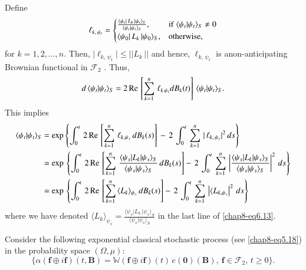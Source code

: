 Define 
\begin{eqnarray}
\ell_{k,\,\psi_t}=
		\begin{cases}
		\frac{\langle \psi_t\vert\, L_k\,\vert\psi_t\rangle_S}{\langle \psi_t\vert \psi_t\rangle_S}, &   {\rm if}\ \langle \psi_t\vert \psi_t\rangle_S\neq 0 \\
		\langle \psi_0\vert\, L_k\,\vert\psi_0\rangle_S, &  {\rm otherwise,}
		\end{cases}\label{chap8-eq6.11}
\end{eqnarray}
for $k=1,2,\ldots , n$.  Then, $\vert  \ell_{k,\,\psi_t} \vert \leq \vert\vert L_k\,\vert\vert$ and hence, $\ell_{k,\, \psi_t}$ is a\break non-anticipating Brownian functional in  $\mathcal{F}_2$ . Thus,    
\begin{eqnarray} 
d\, \langle \psi_t\vert \psi_t\rangle_S= 2\, {\rm Re}\, \left[\sum_{k=1}^{n}\, \ell_{k\, \psi_t} 
dB_k(t)\right]\, \langle \psi_t\vert \psi_t\rangle_S.  \label{chap8-eq6.12}
\end{eqnarray}   
This implies 
{\fontsize{8pt}{10pt}\selectfont 
\begin{align}
	\langle \psi_t\vert \psi_t\rangle_S &=\exp \left\{\int_{0}^{t}\, 2\, {\rm Re}\, \left[ \sum_{k=1}^{n}\,\ell_{k,\psi_s}\, dB_{k}(s)\right]\, -\, 2\,\int_{0}^{t}\, \sum_{k=1}^n\, \vert\,\ell_{k,\,\psi_s}\vert^2\, ds\right\}\nonumber \\ 
	&= {\exp}\,\left\{\int_{0}^{t}\, 2\, {\rm Re}\, \left[ \sum_{k=1}^n\, \frac{\langle \psi_s\vert L_k\vert\psi_s\rangle_S}{\langle \psi_s\vert \psi_s\rangle_S}\, 
	dB_k(s)\right] -\, 2\,\int_{0}^{t}\, \sum_{k=1}^n\, \left|\frac{\langle \psi_s\vert  L_k\vert \psi_s\rangle_S}{\langle \psi_s\vert \psi_s\rangle_S}\right|^2\, ds\right\}\nonumber \\  
	&=  {\exp}\,\left\{\int_{0}^{t}\,  2\,{\rm Re}\, \left[\sum_{k=1}^n\,\langle L_k\rangle_{\psi_s}\, 
	dB_k(s)\right]   -\, 2\,\int_{0}^{t}\, \sum_{k=1}^n\,\left\vert \langle L_{k,\psi_s} \right\vert^2\, ds 
	\right\} \label{chap8-eq6.13}
\end{align}}\relax
where we have denoted $\langle L_k\rangle_{\psi_s}=\frac{\langle \psi_s\vert L_{k}\,\vert\psi_s\rangle_S}
{\langle \psi_s\vert \psi_s\rangle_S}$ in the last line of \eqref{chap8-eq6.13}. 

Consider the following exponential classical stochastic process (see \eqref{chap8-eq5.18}) in the probability space $(\Omega, \mu)$:     
\begin{equation}
\{\alpha(\mathbf{f}\oplus i\mathbf{f})(t,\mathbf{B})=\mathbb{W}(\mathbf{f}\oplus i\mathbf{f})(t)\, e(\mathbf{0})(\mathbf{B}),\ \mathbf{f}\in\mathcal{F}_2,\, t\geq 0\}. \label{chap8-eq6.14}
\end{equation}

